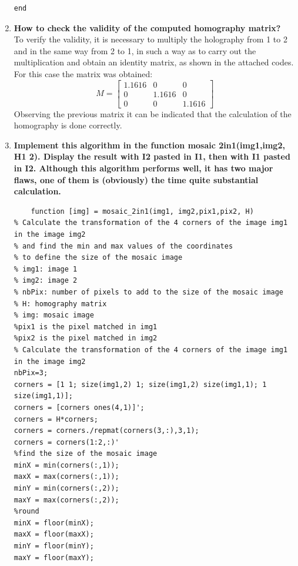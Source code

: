 \documentclass[12pt, twoside]{report}
\begin{document}
\begin{enumerate}
\begin{lstlisting}
end
\end{lstlisting}

    \item \textbf{How to check the validity of the computed homography matrix?}\\
    To verify the validity, it is necessary to multiply the holography from 1 to 2 and in the same way from 2 to 1, in such a way as to carry out the multiplication and obtain an identity matrix, as shown in the attached codes.
    For this case the matrix was obtained:
    \begin{equation}
    M=
        \begin{bmatrix}
1.1616 & 0 & 0\\
0 & 1.1616 & 0 \\
0 & 0 & 1.1616
\end{bmatrix}
    \end{equation}
    Observing the previous matrix it can be indicated that the calculation of the homography is done correctly.
    \item \textbf{Implement this algorithm in the function mosaic 2in1(img1,img2, H1 2). Display the result with I2 pasted in I1, then with I1 pasted in I2. Although this algorithm performs well, it has two major flaws, one of them is (obviously) the time quite substantial calculation.}

\begin{lstlisting}
    function [img] = mosaic_2in1(img1, img2,pix1,pix2, H)
% Calculate the transformation of the 4 corners of the image img1 in the image img2
% and find the min and max values of the coordinates
% to define the size of the mosaic image
% img1: image 1
% img2: image 2
% nbPix: number of pixels to add to the size of the mosaic image
% H: homography matrix
% img: mosaic image
%pix1 is the pixel matched in img1
%pix2 is the pixel matched in img2
% Calculate the transformation of the 4 corners of the image img1 in the image img2
nbPix=3;
corners = [1 1; size(img1,2) 1; size(img1,2) size(img1,1); 1 size(img1,1)];
corners = [corners ones(4,1)]';
corners = H*corners;
corners = corners./repmat(corners(3,:),3,1);
corners = corners(1:2,:)'
%find the size of the mosaic image
minX = min(corners(:,1));
maxX = max(corners(:,1));
minY = min(corners(:,2));
maxY = max(corners(:,2));
%round 
minX = floor(minX);
maxX = floor(maxX);
minY = floor(minY);
maxY = floor(maxY);


\end{lstlisting}
\end{enumerate}
\end{document}
